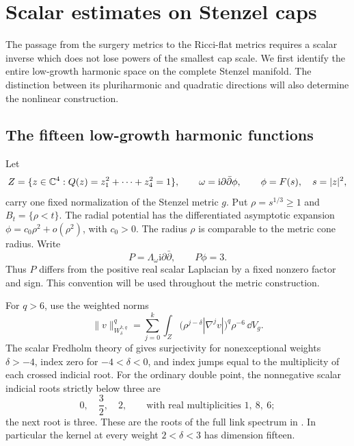 \section{Scalar estimates on Stenzel caps}\label{sec:scalar-caps}

The passage from the surgery metrics to the Ricci-flat metrics requires
a scalar inverse which does not lose powers of the smallest cap scale.
We first identify the entire low-growth harmonic space on the complete
Stenzel manifold. The distinction between its pluriharmonic and
quadratic directions will also determine the nonlinear construction.

\subsection{The fifteen low-growth harmonic functions}

Let
\[
 Z=\{z\in\mathbb C^4:Q(z)=z_1^2+\cdots+z_4^2=1\},\qquad
 \omega=\mathrm i\partial\bar\partial\phi,\qquad
 \phi=F(s),\quad s=|z|^2,
\]
carry one fixed normalization of the Stenzel metric $g$.
Put $\rho=s^{1/3}\ge1$ and $B_t=\{\rho<t\}$. The radial potential
has the differentiated asymptotic expansion
$\phi=c_0\rho^2+o(\rho^2)$, with $c_0>0$.
The radius $\rho$ is comparable to the metric cone radius.
Write
\[
 P=\Lambda_\omega\mathrm i\partial\bar\partial,\qquad P\phi=3.
\]
Thus $P$ differs from the positive real scalar Laplacian by a fixed
nonzero factor and sign. This convention will be used throughout the
metric construction.

For $q>6$, use the weighted norms
\begin{equation}\label{eq:cap-sobolev-norm}
 \|v\|_{W^{k,q}_\delta}^q
 =\sum_{j=0}^k\int_Z
       \bigl(\rho^{j-\delta}|\nabla^jv|\bigr)^q\rho^{-6}\,\dd V_g.
\end{equation}
The scalar Fredholm theory of
\cite[Theorem~7.9, Proposition~7.11, Corollary~9.4 and Section~10]{pacini}
gives surjectivity for nonexceptional weights $\delta>-4$,
index zero for $-4<\delta<0$, and index jumps equal to the
multiplicity of each crossed indicial root. For the ordinary double
point, the nonnegative scalar indicial roots strictly below three are
\[
 0,\quad \frac32,\quad 2,
 \qquad\text{with real multiplicities }1,\ 8,\ 6;
\]
the next root is three. These are the roots of the full link spectrum
in \cite[Example~2.16, equations (2.41)--(2.42)]{hein-sun}.
In particular the kernel at every weight $2<\delta<3$ has dimension
fifteen.

